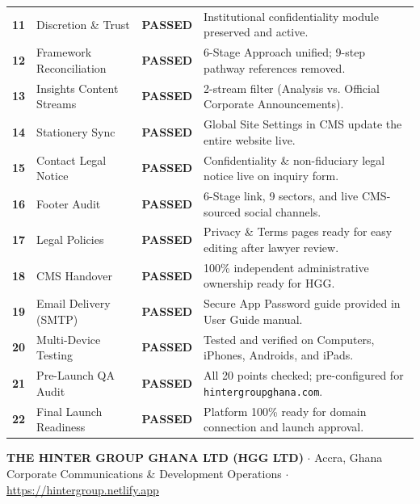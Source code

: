 \documentclass[11pt,a4paper]{article}
\begin{document}
\begin{center}
\begin{tabularx}{\textwidth}{c l c X}
    \textbf{11} & Discretion \& Trust & \textbf{\color{HGGGreen}PASSED} & Institutional confidentiality module preserved and active. \\
    \textbf{12} & Framework Reconciliation & \textbf{\color{HGGGreen}PASSED} & 6-Stage Approach unified; 9-step pathway references removed. \\
    \textbf{13} & Insights Content Streams & \textbf{\color{HGGGreen}PASSED} & 2-stream filter (Analysis vs. Official Corporate Announcements). \\
    \textbf{14} & Stationery Sync & \textbf{\color{HGGGreen}PASSED} & Global Site Settings in CMS update the entire website live. \\
    \textbf{15} & Contact Legal Notice & \textbf{\color{HGGGreen}PASSED} & Confidentiality \& non-fiduciary legal notice live on inquiry form. \\
    \textbf{16} & Footer Audit & \textbf{\color{HGGGreen}PASSED} & 6-Stage link, 9 sectors, and live CMS-sourced social channels. \\
    \textbf{17} & Legal Policies & \textbf{\color{HGGGreen}PASSED} & Privacy \& Terms pages ready for easy editing after lawyer review. \\
    \textbf{18} & CMS Handover & \textbf{\color{HGGGreen}PASSED} & 100\% independent administrative ownership ready for HGG. \\
    \textbf{19} & Email Delivery (SMTP) & \textbf{\color{HGGGreen}PASSED} & Secure App Password guide provided in User Guide manual. \\
    \textbf{20} & Multi-Device Testing & \textbf{\color{HGGGreen}PASSED} & Tested and verified on Computers, iPhones, Androids, and iPads. \\
    \textbf{21} & Pre-Launch QA Audit & \textbf{\color{HGGGreen}PASSED} & All 20 points checked; pre-configured for \texttt{hintergroupghana.com}. \\
    \textbf{22} & Final Launch Readiness & \textbf{\color{HGGGreen}PASSED} & Platform 100\% ready for domain connection and launch approval. \\
    \bottomrule
\end{tabularx}
\end{center}

\vspace{0.4cm}
\begin{center}
    \small\color{HGGMutedText}
    \textbf{THE HINTER GROUP GHANA LTD (HGG LTD)} $\cdot$ Accra, Ghana \\
    Corporate Communications \& Development Operations $\cdot$ \url{https://hintergroup.netlify.app}
\end{center}
\end{document}
